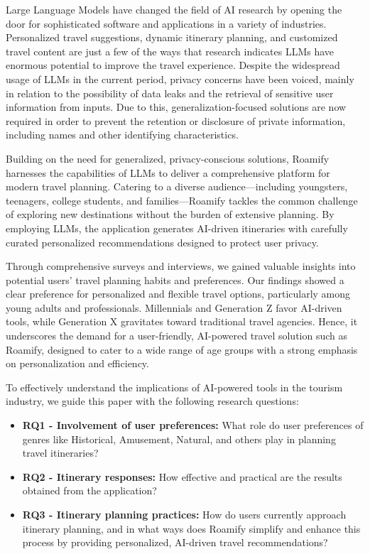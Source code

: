 \documentclass[sigconf,authordraft]{acmart}
\begin{document}
  Large Language Models have changed the field of AI research by opening the door for sophisticated software and applications in a variety of industries. Personalized travel suggestions, dynamic itinerary planning, and customized travel content are just a few of the ways that research indicates LLMs have enormous potential to improve the travel experience\cite{ref1}. Despite the widespread usage of LLMs in the current period, privacy concerns have been voiced, mainly in relation to the possibility of data leaks and the retrieval of sensitive user information from inputs\cite{ref2}. Due to this, generalization-focused solutions are now required in order to prevent the retention or disclosure of private information, including names and other identifying characteristics.

  Building on the need for generalized, privacy-conscious solutions, Roamify harnesses the capabilities of LLMs to deliver a comprehensive platform for modern travel planning. Catering to a diverse audience—including youngsters, teenagers, college students, and families—Roamify tackles the common challenge of exploring new destinations without the burden of extensive planning. By employing LLMs, the application generates AI-driven itineraries with carefully curated personalized recommendations designed to protect user privacy.

  Through comprehensive surveys and interviews, we gained valuable insights into potential users' travel planning habits and preferences. Our findings showed a clear preference for personalized and flexible travel options, particularly among young adults and professionals. Millennials and Generation Z favor AI-driven tools, while Generation X gravitates toward traditional travel agencies. Hence, it underscores the demand for a user-friendly, AI-powered travel solution such as Roamify, designed to cater to a wide range of age groups with a strong emphasis on personalization and efficiency.

  To effectively understand the implications of AI-powered tools in the tourism industry, we guide this paper with the following research questions:

  \begin{itemize}
      \item \textbf{RQ1 - Involvement of user preferences:} What role do user preferences of genres like Historical, Amusement, Natural, and others play in planning travel itineraries?
      \item \textbf{RQ2 - Itinerary responses:} How effective and practical are the results obtained from the application?
      \item \textbf{RQ3 - Itinerary planning practices:} How do users currently approach itinerary planning, and in what ways does Roamify simplify and enhance this process by providing personalized, AI-driven travel recommendations?
  \end{itemize}
\end{document}
